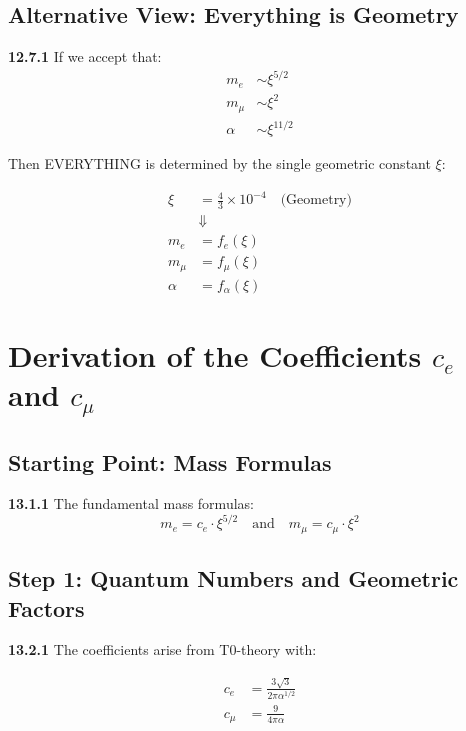 \subsection{Alternative View: Everything is Geometry}

\noindent \textbf{12.7.1} If we accept that:
\begin{align}
	m_e &\sim \xi^{5/2} \\
	m_\mu &\sim \xi^2 \\
	\alpha &\sim \xi^{11/2}
\end{align}

Then EVERYTHING is determined by the single geometric constant $\xi$:

\begin{equation}
	\boxed{
		\begin{aligned}
			\xi &= \frac{4}{3} \times 10^{-4} \quad \text{(Geometry)} \\
			&\Downarrow \\
			m_e &= f_e(\xi) \\
			m_\mu &= f_\mu(\xi) \\
			\alpha &= f_\alpha(\xi)
		\end{aligned}
	}
\end{equation}

\section{Derivation of the Coefficients $c_e$ and $c_\mu$}

\subsection{Starting Point: Mass Formulas}

\noindent \textbf{13.1.1} The fundamental mass formulas:
\[
m_e = c_e \cdot \xi^{5/2} \quad \text{and} \quad m_\mu = c_\mu \cdot \xi^2
\]

\subsection{Step 1: Quantum Numbers and Geometric Factors}

\noindent \textbf{13.2.1} The coefficients arise from T0-theory with:

\begin{align*}
	c_e &= \frac{3\sqrt{3}}{2\pi\alpha^{1/2}} \\
	c_\mu &= \frac{9}{4\pi\alpha}
\end{align*}


